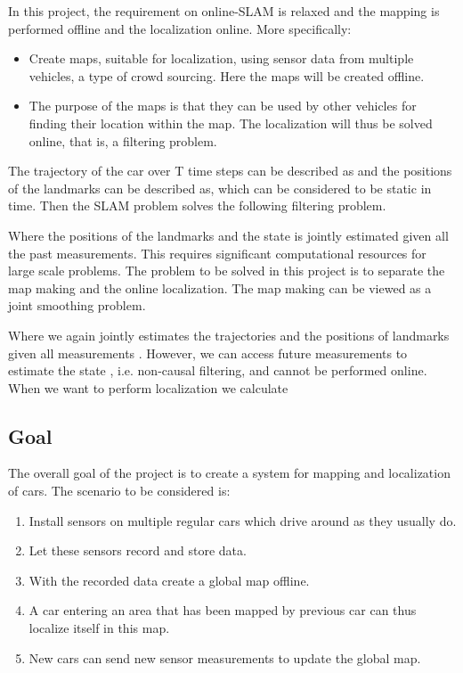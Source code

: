 In this project, the requirement on online-\gls{SLAM} is relaxed and
the mapping is performed offline and the localization online. More
specifically:
\begin{itemize}
\item Create maps, suitable for localization, using sensor data from
  multiple vehicles, a type of crowd sourcing. Here the maps will be
  created offline.

\item The purpose of the maps is that they can be used by other
  vehicles for finding their location within the map. The localization
  will thus be solved online, that is, a filtering problem.
\end{itemize}


The trajectory of the car over T time steps can be described as   and
the positions of the landmarks can be described as, which can be
considered to be static in time. Then the \gls{SLAM} problem solves
the following filtering problem.

Where the positions of the landmarks and the state is jointly
estimated given all the past measurements. This requires significant
computational resources for large scale problems. The problem to be
solved in this project is to separate the map making and the online
localization. The map making can be viewed as a joint smoothing
problem.


Where we again jointly estimates the trajectories  and the positions
of landmarks  given all measurements . However, we can access future
measurements to estimate the state , i.e. non-causal filtering, and
cannot be performed online. When we want to perform localization we
calculate


\subsection{Goal}

The overall goal of the project is to create a system for mapping and
localization of cars. The scenario to be considered is:
\begin{enumerate}
\item  Install sensors on multiple regular cars which drive around as
  they usually do.
\item Let these sensors record and store data.
\item With the recorded data create a global map offline.
\item A car entering an area that has been mapped by previous car can
  thus localize itself in this map.
\item New cars can send new sensor measurements to update the global
  map.
\end{enumerate}

